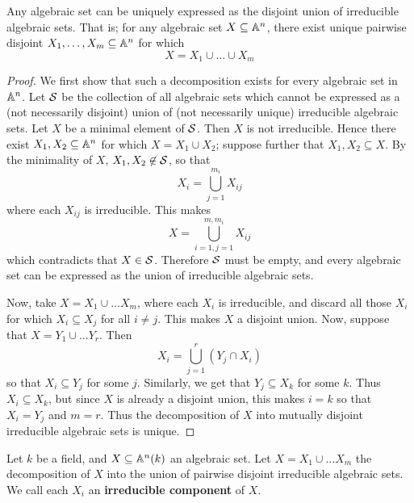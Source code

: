 \begin{theorem}\label{1.5.3}
    Any algebraic set can be uniquely expressed as the disjoint union of
    irreducible algebraic sets. That is; for any algebraic set $X \subseteq
    \mathbb{A}^n$, there exist unique pairwise disjoint $X_1, \dots, X_m \subseteq \mathbb{A}^n$
    for which
    \begin{equation*}
        X=X_1 \cup \dots \cup X_m
    \end{equation*}
\end{theorem}
\begin{proof}
    We first show that such a decomposition exists for every algebraic set in
    $\mathbb{A}^n$. Let  $\mathcal{S}$ be the collection of all algebraic sets which cannot be
    expressed as a (not necessarily disjoint) union of (not necessarily unique)
    irreducible algebraic sets. Let $X$ be a minimal element of $\mathcal{S}$. Then
    $X$ is not irreducible. Hence there exist $X_1, X_2 \subseteq \mathbb{A}^n$ for
    which $X=X_1 \cup X_2$; suppose further that $X_1,X_2 \subseteq X$. By the
    minimality of $X$,  $X_1, X_2 \not\in \mathcal{S}$, so that
    \begin{equation*}
        X_i=\bigcup_{j=1}^{m_i}{X_{ij}}
    \end{equation*}
    where each $X_{ij}$ is irreducible. This makes
    \begin{equation*}
        X=\bigcup_{i=1,j=1}^{m,m_i}{X_{ij}}
    \end{equation*}
    which contradicts that $X \in \mathcal{S}$. Therefore $\mathcal{S}$ must be empty, and every
    algebraic set can be expressed as the union of irreducible algebraic sets.

    Now, take  $X=X_1 \cup \dots X_m$, where each $X_i$ is irreducible, and
    discard all those $X_i$ for which  $X_i \subseteq X_j$ for all $i \neq j$.
    This makes $X$ a disjoint union. Now, suppose that  $X=Y_1 \cup \dots Y_r$.
    Then
    \begin{equation*}
        X_i=\bigcup_{j=1}^r{(Y_j \cap X_i)}
    \end{equation*}
    so that $X_i \subseteq Y_j$ for some $j$. Similarly, we get that  $Y_j
    \subseteq X_k$ for some $k$. Thus $X_i \subseteq X_k$, but since $X$ is
    already a disjoint union, this makes  $i=k$ so that $X_i=Y_j$ and $m=r$.
    Thus the decomposition of $X$ into mutually disjoint irreducible algebraic
    sets is unique.
\end{proof}

\begin{definition}
    Let $k$ be a field, and $X \subseteq \mathbb{A}^n(k)$ an algebraic set. Let $X=X_1
    \cup \dots X_m$ the decomposition of $X$ into the union of pairwise disjoint
    irreducible algebraic sets. We call each $X_i$ an \textbf{irreducible
    component} of $X$.
\end{definition}
